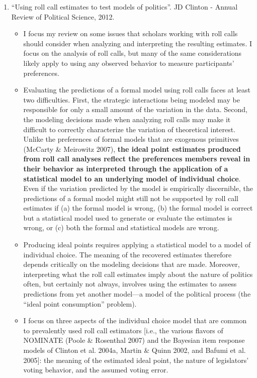\documentclass[a4paper,12pt]{article}
\begin{document}
\begin{enumerate}
\item “Using roll call estimates to test models of politics”. JD Clinton - Annual Review of Political Science, 2012. 
\begin{itemize}
\item I focus my review on some issues that scholars working with roll calls should consider when analyzing and interpreting the resulting estimates. I focus on the analysis of roll calls, but many of the same considerations likely apply to using any observed behavior to measure participants’ preferences. 
\item Evaluating the predictions of a formal model using roll calls faces at least two difficulties. First, the strategic interactions being modeled may be responsible for only a small amount of the variation in the data. Second, the modeling decisions made when analyzing roll calls may make it difficult to correctly characterize the variation of theoretical interest. Unlike the preferences of formal models that are exogenous primitives (McCarty \& Meirowitz 2007), \textbf{the ideal point estimates produced from roll call analyses reflect the preferences members reveal in their behavior as interpreted through the application of a statistical model to an underlying model of individual choice}. Even if the variation predicted by the model is empirically discernible, the predictions of a formal model might still not be supported by roll call estimates if (a) the formal model is wrong, (b) the formal model is correct but a statistical model used to generate or evaluate the estimates is wrong, or (c) both the formal and statistical models are wrong. 
\item Producing ideal points requires applying a statistical model to a model of individual choice. The meaning of the recovered estimates therefore depends critically on the modeling decisions that are made. Moreover, interpreting what the roll call estimates imply about the nature of politics often, but certainly not always, involves using the estimates to assess predictions from yet another model—a model of the political process (the “ideal point consumption” problem). 
\item I focus on three aspects of the individual choice model that are common to prevalently used roll call estimators [i.e., the various flavors of NOMINATE (Poole \& Rosenthal 2007) and the Bayesian item response models of Clinton et al. 2004a, Martin \& Quinn 2002, and Bafumi et al. 2005]: the meaning of the estimated ideal point, the nature of legislators’ voting behavior, and the assumed voting error.  

\end{itemize}
\end{enumerate}
\end{document}
